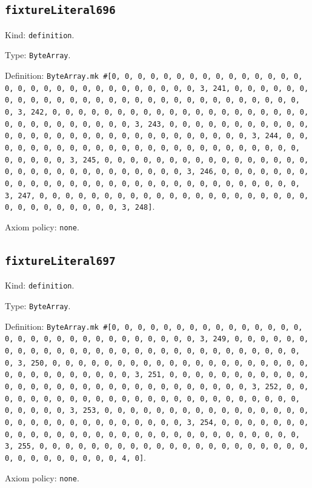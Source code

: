 \documentclass[11pt]{article}
\begin{document}
\subsection*{\texttt{fixtureLiteral696}}
\noindent Kind: \texttt{definition}.\par
\noindent Type: \texttt{ByteArray}.\par
\noindent Definition: \texttt{ByteArray.mk \#[0, 0, 0, 0, 0, 0, 0, 0, 0, 0, 0, 0, 0, 0, 0, 0, 0, 0, 0, 0, 0, 0, 0, 0, 0, 0, 0, 0, 0, 0, 3, 241, 0, 0, 0, 0, 0, 0, 0, 0, 0, 0, 0, 0, 0, 0, 0, 0, 0, 0, 0, 0, 0, 0, 0, 0, 0, 0, 0, 0, 0, 0, 3, 242, 0, 0, 0, 0, 0, 0, 0, 0, 0, 0, 0, 0, 0, 0, 0, 0, 0, 0, 0, 0, 0, 0, 0, 0, 0, 0, 0, 0, 0, 0, 3, 243, 0, 0, 0, 0, 0, 0, 0, 0, 0, 0, 0, 0, 0, 0, 0, 0, 0, 0, 0, 0, 0, 0, 0, 0, 0, 0, 0, 0, 0, 0, 3, 244, 0, 0, 0, 0, 0, 0, 0, 0, 0, 0, 0, 0, 0, 0, 0, 0, 0, 0, 0, 0, 0, 0, 0, 0, 0, 0, 0, 0, 0, 0, 3, 245, 0, 0, 0, 0, 0, 0, 0, 0, 0, 0, 0, 0, 0, 0, 0, 0, 0, 0, 0, 0, 0, 0, 0, 0, 0, 0, 0, 0, 0, 0, 3, 246, 0, 0, 0, 0, 0, 0, 0, 0, 0, 0, 0, 0, 0, 0, 0, 0, 0, 0, 0, 0, 0, 0, 0, 0, 0, 0, 0, 0, 0, 0, 3, 247, 0, 0, 0, 0, 0, 0, 0, 0, 0, 0, 0, 0, 0, 0, 0, 0, 0, 0, 0, 0, 0, 0, 0, 0, 0, 0, 0, 0, 0, 0, 3, 248]}.\par
\noindent Axiom policy: \texttt{none}.\par
\subsection*{\texttt{fixtureLiteral697}}
\noindent Kind: \texttt{definition}.\par
\noindent Type: \texttt{ByteArray}.\par
\noindent Definition: \texttt{ByteArray.mk \#[0, 0, 0, 0, 0, 0, 0, 0, 0, 0, 0, 0, 0, 0, 0, 0, 0, 0, 0, 0, 0, 0, 0, 0, 0, 0, 0, 0, 0, 0, 3, 249, 0, 0, 0, 0, 0, 0, 0, 0, 0, 0, 0, 0, 0, 0, 0, 0, 0, 0, 0, 0, 0, 0, 0, 0, 0, 0, 0, 0, 0, 0, 3, 250, 0, 0, 0, 0, 0, 0, 0, 0, 0, 0, 0, 0, 0, 0, 0, 0, 0, 0, 0, 0, 0, 0, 0, 0, 0, 0, 0, 0, 0, 0, 3, 251, 0, 0, 0, 0, 0, 0, 0, 0, 0, 0, 0, 0, 0, 0, 0, 0, 0, 0, 0, 0, 0, 0, 0, 0, 0, 0, 0, 0, 0, 0, 3, 252, 0, 0, 0, 0, 0, 0, 0, 0, 0, 0, 0, 0, 0, 0, 0, 0, 0, 0, 0, 0, 0, 0, 0, 0, 0, 0, 0, 0, 0, 0, 3, 253, 0, 0, 0, 0, 0, 0, 0, 0, 0, 0, 0, 0, 0, 0, 0, 0, 0, 0, 0, 0, 0, 0, 0, 0, 0, 0, 0, 0, 0, 0, 3, 254, 0, 0, 0, 0, 0, 0, 0, 0, 0, 0, 0, 0, 0, 0, 0, 0, 0, 0, 0, 0, 0, 0, 0, 0, 0, 0, 0, 0, 0, 0, 3, 255, 0, 0, 0, 0, 0, 0, 0, 0, 0, 0, 0, 0, 0, 0, 0, 0, 0, 0, 0, 0, 0, 0, 0, 0, 0, 0, 0, 0, 0, 0, 4, 0]}.\par
\noindent Axiom policy: \texttt{none}.\par
\end{document}

